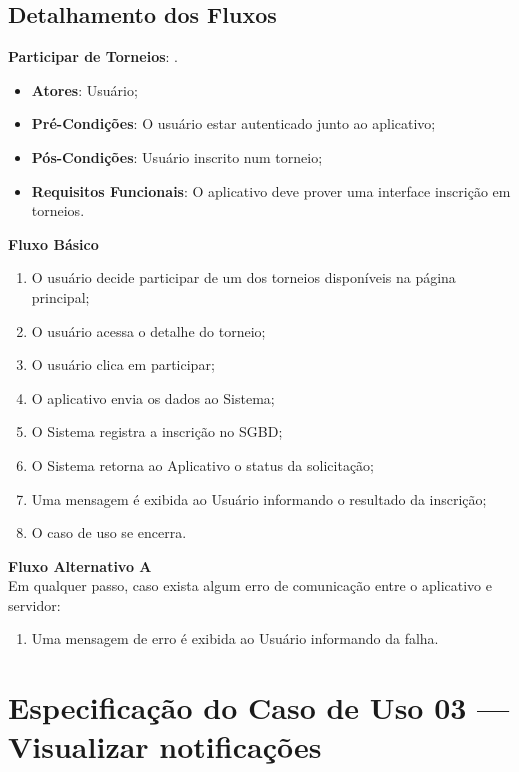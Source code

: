 \subsection*{Detalhamento dos Fluxos}
\begin{lista}
  \item \textbf{Participar de Torneios}: .
    \begin{itemize}
    \item \textbf{Atores}: Usuário;
    \item \textbf{Pré-Condições}: O usuário estar autenticado junto ao aplicativo;
    \item \textbf{Pós-Condições}: Usuário inscrito num torneio;
    \item \textbf{Requisitos Funcionais}: O aplicativo deve prover uma interface inscrição em torneios.
    \end{itemize}
	
    \textbf{Fluxo Básico}
    \begin{enumerate}
    \item O usuário decide participar de um dos torneios disponíveis na página principal;
    \item O usuário acessa o detalhe do torneio;
    \item O usuário clica em participar;
    \item O aplicativo envia os dados ao Sistema;
    \item O Sistema registra a inscrição no SGBD;
    \item O Sistema retorna ao Aplicativo o status da solicitação;
    \item Uma mensagem é exibida ao Usuário informando o resultado da inscrição;
    \item O caso de uso se encerra.
    \end{enumerate}
    
    \textbf{Fluxo Alternativo A} \\
    Em qualquer passo, caso exista algum erro de comunicação entre o aplicativo e servidor:
    \begin{enumerate}
    \item Uma mensagem de erro é exibida ao Usuário informando da falha.
    \end{enumerate}
\end{lista}
\pagebreak

\section*{Especificação do Caso de Uso 03 --- Visualizar notificações}

